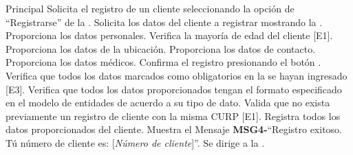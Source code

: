 	\begin{UCtrayectoria}{Principal}
		\UCpaso[\UCactor] Solicita el registro de un cliente seleccionando la opción de ``Registrarse'' de la .
		\UCpaso Solicita los datos del cliente a registrar mostrando la .
		\UCpaso[\UCactor] Proporciona los datos personales.
		\UCpaso Verifica la mayoría de edad del cliente [E1].
		\UCpaso[\UCactor] Proporciona los datos de la ubicación.
		\UCpaso[\UCactor] Proporciona los datos de contacto.
		\UCpaso[\UCactor] Proporciona los datos médicos.
		\UCpaso[\UCactor] Confirma el registro presionando el botón .
		\UCpaso Verifica que todos los datos marcados como obligatorios en la  se hayan ingresado [E3].
		\UCpaso Verifica que todos los datos proporcionados tengan el formato especificado en el modelo de entidades de acuerdo a su tipo de dato.
		\UCpaso Valida que no exista previamente un registro de cliente con la misma CURP [E1].
		\UCpaso Registra todos los datos proporcionados del cliente.
		\UCpaso Muestra el Mensaje {\bf MSG4-}``Registro exitoso. Tú número de cliente es: [{\em Número de cliente}]''.
		\UCpaso Se dirige a la .
		
	\end{UCtrayectoria}
	

	
